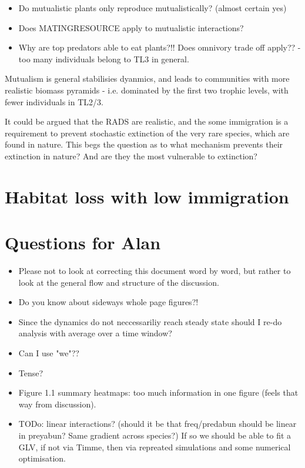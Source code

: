 \begin{itemize}
\begin{itemize}
	\item Do mutualistic plants only reproduce mutualistically? (almost certain yes)
	\item Does MATINGRESOURCE apply to mutualistic interactions?
	\item Why are top predators able to eat plants?!! Does omnivory trade off apply?? - too many individuals belong to TL3 in general.
\end{itemize}

Mutualism is general stabilisies dyanmics, and leads to communities with more realistic biomass pyramids - i.e. dominated by the first two trophic levels, with fewer individuals in TL2/3. 

It could be argued that the RADS are realistic, and the some immigration is a requirement to prevent stochastic extinction of the very rare species, which are found in nature. This begs the question as to what mechanism prevents their extinction in nature? And are they the most vulnerable to extinction?  

\section{Habitat loss with low immigration}

\section{Questions for Alan}

\begin{itemize}
	\item Please not to look at correcting this document word by word, but rather to look at the general flow and structure of the discussion. 
	\item Do you know about sideways whole page figures?!
	\item Since the dynamics do not neccessariliy reach steady state should I re-do analysis with average over a time window?
	\item Can I use "we"??
	\item Tense?
	\item Figure 1.1 summary heatmaps: too much information in one figure (feels that way from discussion).
		
	\item TODo: linear interactions? (should it be that freq/predabun should be linear in preyabun? Same gradient across species?) If so we should be able to fit a GLV, if not via Timme, then via repreated simulations and some numerical optimisation.

\end{itemize}

\end{itemize}
